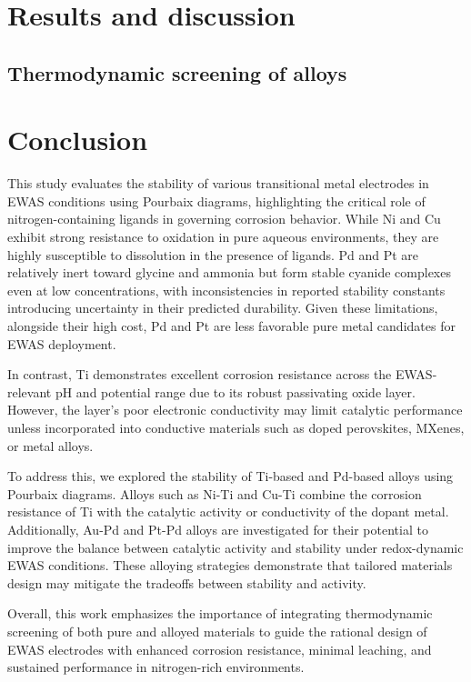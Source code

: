 \documentclass[journal=jacsat,manuscript=article]{achemso}
\begin{document}
\section{Results and discussion}



\subsection{Thermodynamic screening of alloys} \label{sec:alloy_screening}





\section{Conclusion}

This study evaluates the stability of various transitional metal electrodes in EWAS conditions using Pourbaix diagrams, highlighting the critical role of nitrogen-containing ligands in governing corrosion behavior. While Ni and Cu exhibit strong resistance to oxidation in pure aqueous environments, they are highly susceptible to dissolution in the presence of  ligands. Pd and Pt are relatively inert toward glycine and ammonia but form stable cyanide complexes even at low concentrations, with inconsistencies in reported stability constants introducing uncertainty in their predicted durability. Given these limitations, alongside their high cost, Pd and Pt are less favorable pure metal candidates for EWAS deployment.

In contrast, Ti demonstrates excellent corrosion resistance across the EWAS-relevant pH and potential range due to its robust passivating oxide layer. However, the  layer's poor electronic conductivity may limit catalytic performance unless incorporated into conductive materials such as doped perovskites, MXenes, or metal alloys.

To address this, we explored the stability of Ti-based and Pd-based alloys using Pourbaix diagrams. Alloys such as Ni-Ti and Cu-Ti combine the corrosion resistance of Ti with the catalytic activity or conductivity of the dopant metal. Additionally, Au-Pd and Pt-Pd alloys are investigated for their potential to improve the balance between catalytic activity and stability under redox-dynamic EWAS conditions. These alloying strategies demonstrate that tailored materials design may mitigate the tradeoffs between stability and activity.

Overall, this work emphasizes the importance of integrating thermodynamic screening of both pure and alloyed materials to guide the rational design of EWAS electrodes with enhanced corrosion resistance, minimal leaching, and sustained performance in nitrogen-rich environments.
\end{document}
